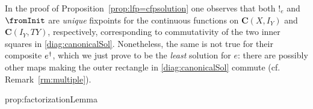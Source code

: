 \documentclass[oribibl,envcountsame,envcountsect,runningheads]{llncs}
\newcommand{\cat}[1]{\ensuremath{\mathbf{#1}}}
\newcommand{\toFinal}[1]{{!_{#1}}}\DeclareMathSymbol{\fromInit}{\mathord}{operators}{"3C}
\renewcommand{\>}{\rangle}
\def\carrier{I}
\newenvironment{proposition_for}[2][\empty]{\bigskip\noindent{\bf
    Proposition~\ref{#2}}\ifthenelse{\equal{#1}{\empty}}{{\bf.}}{ {\bf
      (#1).}}\it}{\vspace{0.5cm}}
\begin{document}
\begin{remark}\label{rm:uniqueness} In the proof of Proposition~\ref{prop:lfp=cfpsolution} one observes that both $\toFinal{e}$ and $\fromInit$ are \emph{unique} fixpoints for the continuous functions on $\cat C(X, \carrier_Y)$ and $\cat C(\carrier_Y, TY)$, respectively, corresponding to commutativity of the two inner squares in \eqref{diag:canonicalSol}. Nonetheless, the same is not true for their composite ${e}^\dag$, which we just prove to be the \emph{least} solution for $e$: there are possibly other maps making the outer rectangle in \eqref{diag:canonicalSol} commute (cf. Remark~\ref{rm:multiple}).
\end{remark}

 \begin{proposition_for}{prop:factorizationLemma}
 \propfact
 \end{proposition_for}
\end{document}
